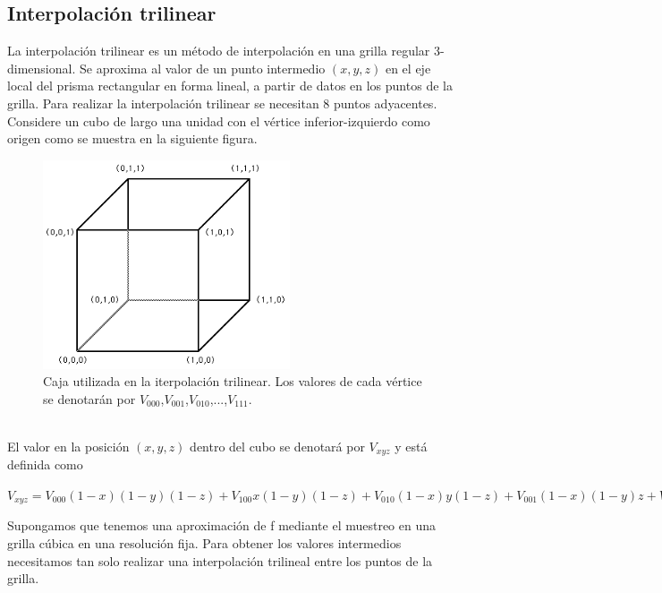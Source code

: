 \documentclass[12pt]{article}
\begin{document}
\subsection{Interpolación trilinear}
La interpolación trilinear\cite{inter} es un método de interpolación en una grilla regular 3-dimensional. Se aproxima al valor de un punto intermedio $(x, y, z)$ en el eje local del prisma rectangular en forma lineal, a partir de datos en los puntos de la grilla. Para realizar la interpolación trilinear se necesitan 8 puntos adyacentes.
Considere un cubo de largo una unidad con el vértice inferior-izquierdo como origen como se muestra en la siguiente figura.
\begin{figure}[h!]
\includegraphics[width=0.65\textwidth,center]{inter.png}
\caption{Caja utilizada en la iterpolación trilinear. Los valores de cada vértice se denotarán por $V_{000}$,$V_{001}$,$V_{010}$,...,$V_{111}$.}
\end{figure}
\\El valor en la posición $(x,y,z)$ dentro del cubo se denotará por $V_{xyz}$ y está definida como
\begin{center}
$V_{xyz}=V_{000}(1-x)(1-y)(1-z) + V_{100}x(1-y)(1-z) + V_{010}(1-x)y(1-z) + V_{001}(1-x)(1-y)z + V_{101}x(1-y)z + V_{011}(1-x)yz + V_{110}xy(1-z) + V_{111}xyz$
\end{center}
Supongamos que tenemos una aproximación de f mediante el muestreo en una grilla cúbica en una resolución fija. Para obtener los valores intermedios necesitamos tan solo realizar una interpolación trilineal entre los puntos de la grilla.
\end{document}
